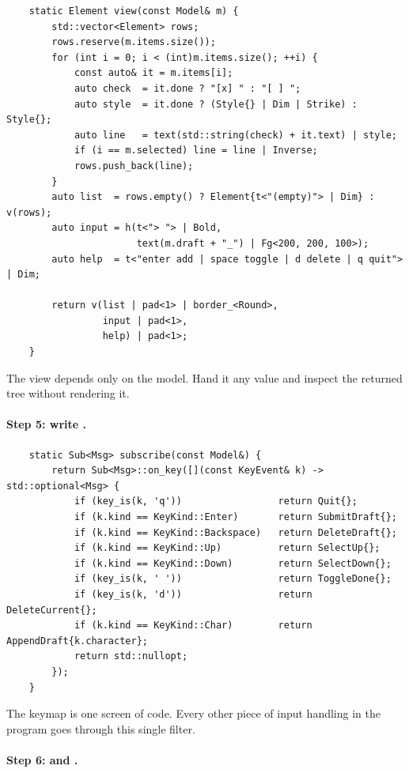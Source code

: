 \begin{lstlisting}
    static Element view(const Model& m) {
        std::vector<Element> rows;
        rows.reserve(m.items.size());
        for (int i = 0; i < (int)m.items.size(); ++i) {
            const auto& it = m.items[i];
            auto check  = it.done ? "[x] " : "[ ] ";
            auto style  = it.done ? (Style{} | Dim | Strike) : Style{};
            auto line   = text(std::string(check) + it.text) | style;
            if (i == m.selected) line = line | Inverse;
            rows.push_back(line);
        }
        auto list  = rows.empty() ? Element{t<"(empty)"> | Dim} : v(rows);
        auto input = h(t<"> "> | Bold,
                       text(m.draft + "_") | Fg<200, 200, 100>);
        auto help  = t<"enter add | space toggle | d delete | q quit"> | Dim;

        return v(list | pad<1> | border_<Round>,
                 input | pad<1>,
                 help) | pad<1>;
    }
\end{lstlisting}

The view depends only on the model. Hand it any  value
and inspect the returned  tree without rendering it.

\paragraph{Step 5: write .}

\begin{lstlisting}
    static Sub<Msg> subscribe(const Model&) {
        return Sub<Msg>::on_key([](const KeyEvent& k) -> std::optional<Msg> {
            if (key_is(k, 'q'))                 return Quit{};
            if (k.kind == KeyKind::Enter)       return SubmitDraft{};
            if (k.kind == KeyKind::Backspace)   return DeleteDraft{};
            if (k.kind == KeyKind::Up)          return SelectUp{};
            if (k.kind == KeyKind::Down)        return SelectDown{};
            if (key_is(k, ' '))                 return ToggleDone{};
            if (key_is(k, 'd'))                 return DeleteCurrent{};
            if (k.kind == KeyKind::Char)        return AppendDraft{k.character};
            return std::nullopt;
        });
    }
\end{lstlisting}

The keymap is one screen of code. Every other piece of input
handling in the program goes through this single filter.

\paragraph{Step 6:  and .}

